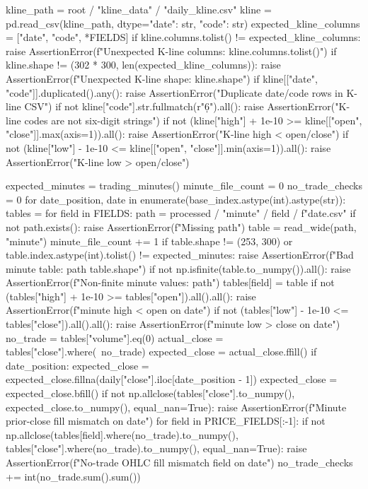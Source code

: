 \documentclass[UTF8,a4paper,fontset=fandol]{ctexart}
\begin{document}
\begin{ProjectCode}
    kline_path = root / "kline_data" / "daily_kline.csv"
    kline = pd.read_csv(kline_path, dtype={"date": str, "code": str})
    expected_kline_columns = ["date", "code", *FIELDS]
    if kline.columns.tolist() != expected_kline_columns:
        raise AssertionError(f"Unexpected K-line columns: {kline.columns.tolist()}")
    if kline.shape != (302 * 300, len(expected_kline_columns)):
        raise AssertionError(f"Unexpected K-line shape: {kline.shape}")
    if kline[["date", "code"]].duplicated().any():
        raise AssertionError("Duplicate date/code rows in K-line CSV")
    if not kline["code"].str.fullmatch(r"\d{6}").all():
        raise AssertionError("K-line codes are not six-digit strings")
    if not (kline["high"] + 1e-10 >= kline[["open", "close"]].max(axis=1)).all():
        raise AssertionError("K-line high < open/close")
    if not (kline["low"] - 1e-10 <= kline[["open", "close"]].min(axis=1)).all():
        raise AssertionError("K-line low > open/close")

    expected_minutes = trading_minutes()
    minute_file_count = 0
    no_trade_checks = 0
    for date_position, date in enumerate(base_index.astype(int).astype(str)):
        tables = {}
        for field in FIELDS:
            path = processed / "minute" / field / f"{date}.csv"
            if not path.exists():
                raise AssertionError(f"Missing {path}")
            table = read_wide(path, "minute")
            minute_file_count += 1
            if table.shape != (253, 300) or table.index.astype(int).tolist() != expected_minutes:
                raise AssertionError(f"Bad minute table: {path} {table.shape}")
            if not np.isfinite(table.to_numpy()).all():
                raise AssertionError(f"Non-finite minute values: {path}")
            tables[field] = table
        if not (tables["high"] + 1e-10 >= tables["open"]).all().all():
            raise AssertionError(f"minute high < open on {date}")
        if not (tables["low"] - 1e-10 <= tables["close"]).all().all():
            raise AssertionError(f"minute low > close on {date}")
        no_trade = tables["volume"].eq(0)
        actual_close = tables["close"].where(~no_trade)
        expected_close = actual_close.ffill()
        if date_position:
            expected_close = expected_close.fillna(daily["close"].iloc[date_position - 1])
        expected_close = expected_close.bfill()
        if not np.allclose(tables["close"].to_numpy(), expected_close.to_numpy(), equal_nan=True):
            raise AssertionError(f"Minute prior-close fill mismatch on {date}")
        for field in PRICE_FIELDS[:-1]:
            if not np.allclose(tables[field].where(no_trade).to_numpy(),
                               tables["close"].where(no_trade).to_numpy(), equal_nan=True):
                raise AssertionError(f"No-trade OHLC fill mismatch {field} on {date}")
        no_trade_checks += int(no_trade.sum().sum())


\end{ProjectCode}
\end{document}
